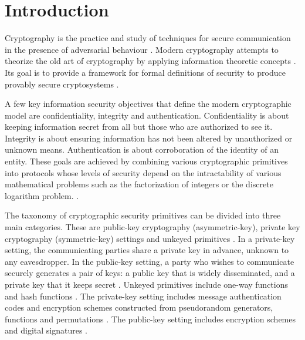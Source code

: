 \chapter{Introduction}

Cryptography is the practice and study of techniques for secure communication in the presence of adversarial behaviour \cite{ref01}. Modern cryptography attempts to theorize the old art of cryptography by applying information theoretic concepts \cite{ref03}. Its goal is to provide a framework for formal definitions of security to produce provably secure cryptosystems \cite{ref02}.  

 

A few key information security objectives that define the modern cryptographic model are confidentiality, integrity and authentication. Confidentiality is about keeping information secret from all but those who are authorized to see it. Integrity is about ensuring information has not been altered by unauthorized or unknown means. Authentication is about corroboration of the identity of an entity. These goals are achieved by combining various cryptographic primitives into protocols whose levels of security depend on the intractability of various mathematical problems such as the factorization of integers or the discrete logarithm problem. \cite{ref04}.  

 

The taxonomy of cryptographic security primitives can be divided into three main categories. These are public-key cryptography (asymmetric-key), private key cryptography (symmetric-key) settings and unkeyed primitives \cite{ref04}. In a private-key setting, the communicating parties share a private key in advance, unknown to any eavesdropper. In the public-key setting, a party who wishes to communicate securely generates a pair of keys: a public key that is widely disseminated, and a private key that it keeps secret \cite{ref02}. Unkeyed primitives include one-way functions and hash functions \cite{ref04}. The private-key setting includes message authentication codes and encryption schemes constructed from pseudorandom generators, functions and permutations \cite{ref02}. The public-key setting includes encryption schemes and digital signatures \cite{ref04}. 

 

